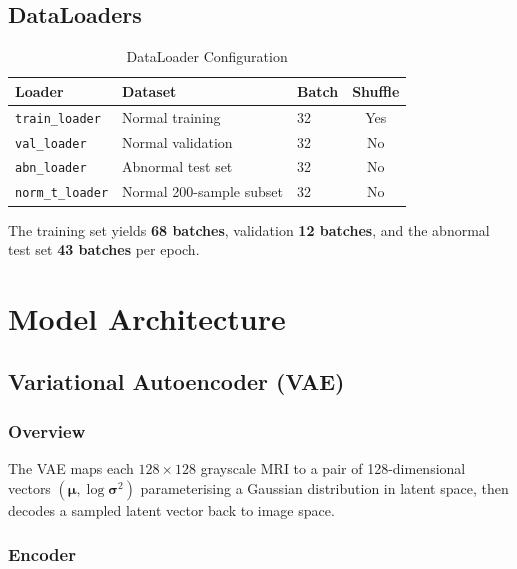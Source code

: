 \documentclass[12pt,a4paper]{article}
\begin{document}
\subsection{DataLoaders}

\begin{table}[H]
\centering
\caption{DataLoader Configuration}
\begin{tabular}{lllc}
\toprule
\textbf{Loader}          & \textbf{Dataset}              & \textbf{Batch} & \textbf{Shuffle} \\
\midrule
\texttt{train\_loader}   & Normal training               & 32 & Yes \\
\texttt{val\_loader}     & Normal validation             & 32 & No  \\
\texttt{abn\_loader}     & Abnormal test set             & 32 & No  \\
\texttt{norm\_t\_loader} & Normal 200-sample subset      & 32 & No  \\
\bottomrule
\end{tabular}
\end{table}

\noindent The training set yields \textbf{68 batches}, validation \textbf{12 batches}, and the
abnormal test set \textbf{43 batches} per epoch.

\section{Model Architecture}
\label{sec:arch}

\subsection{Variational Autoencoder (VAE)}

\subsubsection{Overview}

The VAE maps each $128\times128$ grayscale MRI to a pair of 128-dimensional vectors
$(\boldsymbol{\mu},\log\boldsymbol{\sigma}^2)$ parameterising a Gaussian distribution in latent
space, then decodes a sampled latent vector back to image space.

\subsubsection{Encoder}
\end{document}
